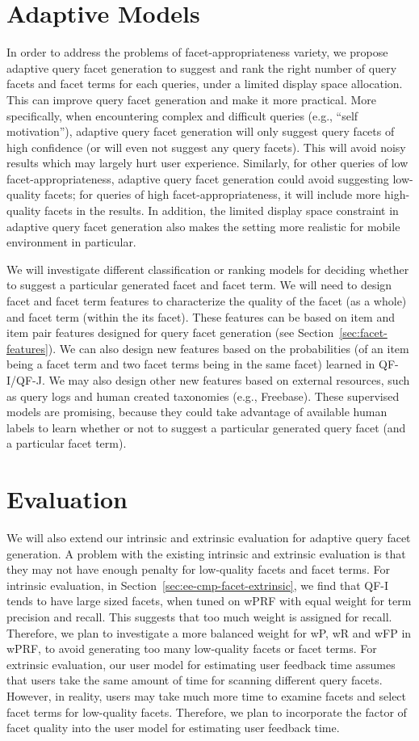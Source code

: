 \section{Adaptive Models}
In order to address the problems of facet-appropriateness variety, we propose adaptive query facet generation to suggest and rank the right number of query facets and facet terms for each queries, under a limited display space allocation. This can improve query facet generation and make it more practical. More specifically, when encountering complex and difficult queries (e.g., ``self motivation''), adaptive query facet generation will only suggest query facets of high confidence (or will even not suggest any query facets). This will avoid noisy results which may largely hurt user experience. Similarly, for other queries of low facet-appropriateness, adaptive query facet generation could avoid suggesting low-quality facets; for queries of high facet-appropriateness, it will include more high-quality facets in the results. In addition, the limited display space constraint in adaptive query facet generation also makes the setting more realistic for mobile environment in particular.

We will investigate different classification or ranking models for deciding whether to suggest a particular generated facet and facet term. We will need to design facet and facet term features to characterize the quality of the facet (as a whole) and facet term (within the its facet). These features can be based on item and item pair features designed for query facet generation (see Section~\ref{sec:facet-features}). We can also design new features based on the probabilities (of an item being a facet term and two facet terms being in the same facet) learned in QF-I/QF-J. We may also design other new features based on external resources, such as query logs and human created taxonomies (e.g., Freebase). These supervised models are promising, because they could take advantage of available human labels to learn whether or not to suggest a particular generated query facet (and a particular facet term).

\section{Evaluation}
We will also extend our intrinsic and extrinsic evaluation for adaptive query facet generation. A problem with the existing intrinsic and extrinsic evaluation is that they may not have enough penalty for low-quality facets and facet terms.
For intrinsic evaluation, in Section~\ref{sec:ee-cmp-facet-extrinsic}, we find that QF-I tends to have large sized facets, when tuned on wPRF with equal weight for term precision and recall. This suggests that too much weight is assigned for recall. Therefore, we plan to investigate a more balanced weight for wP, wR and wFP in wPRF, to avoid generating too many low-quality facets or facet terms. For extrinsic evaluation, our user model for estimating user feedback time assumes that users take the same amount of time for scanning different query facets. However, in reality, users may take much more time to examine facets and select facet terms for low-quality facets. Therefore, we plan to incorporate the factor of facet quality into the user model for estimating user feedback time.
 